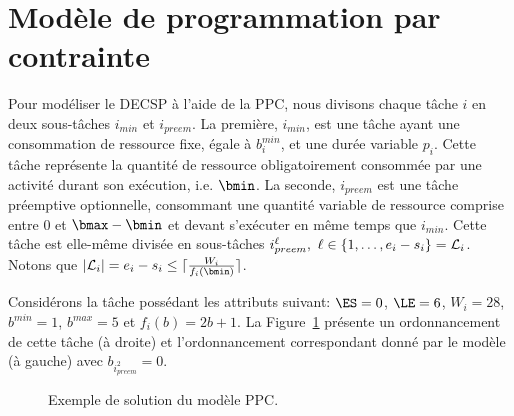 \section{Modèle de programmation par contrainte}

Pour modéliser le DECSP à l'aide de la PPC, nous divisons chaque tâche
$i$ en deux sous-tâches $i_{min}$ et $i_{preem}$. La première,
$i_{min}$, est une tâche ayant une consommation de ressource fixe,
égale à $b_i^{min}$, et une durée variable $p_i$. Cette tâche
représente la quantité de ressource obligatoirement consommée par une
activité durant son exécution, i.e. $\bmin$.  La seconde, $i_{preem}$
est une tâche préemptive optionnelle, consommant une quantité variable
de ressource comprise entre $0$ et $\bmax-\bmin$ et devant s'exécuter
en même temps que $i_{min}$. Cette tâche est elle-même divisée en
sous-tâches $i_{preem}^\ell,\ \ell \in \{1,\dots, e_i-s_i\}={\cal L}_i$. Notons
que $|{\cal L}_i|=e_i - s_i \le \lceil \frac{W_i}{f_i(\bmin)}\rceil$. 
\begin{ex}
Considérons la tâche possédant les attributs suivant:  $\ES= 0$,
$\LE=6$, $W_i=28$, $b^{min}=1$,
$b^{max}=5$ et $f_i(b)=2b+1$. La Figure~\ref{fig:ex:PPC} présente un
ordonnancement de cette tâche (à droite) et l'ordonnancement
correspondant donné par le modèle (à gauche) avec $b_{i^2_{preem}}=0$. 
\begin{figure}[!htb]
  \centering
  \caption{Exemple de solution du modèle PPC.}
  \label{fig:ex:PPC}
\end{figure}
\end{ex}
